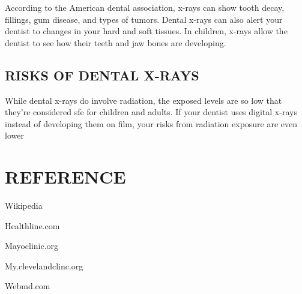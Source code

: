 \documentclass[12pt]{article}
\begin{document}
{\large According to the American dental association, x-rays can show tooth decay, fillings, gum disease, and types of tumors. Dental x-rays can also alert your dentist to changes in your hard and soft tissues. In children, x-rays allow the dentist to see how their teeth and jaw bones are developing.}



\subsection{RISKS OF DENTAL X-RAYS}

{\large While dental x-rays do involve radiation, the exposed levels are so low that they're considered sfe for children and adults. If your dentist uses digital x-rays instead of developing them on film, your risks from radiation exposure are even lower}


\clearpage


\section{REFERENCE}

\begin{itemize}
{\large \item Wikipedia 
\item Healthline.com
\item Mayoclinic.org
\item My.clevelandclinc.org
\item Webmd.com}
\end{itemize}
\end{document}
